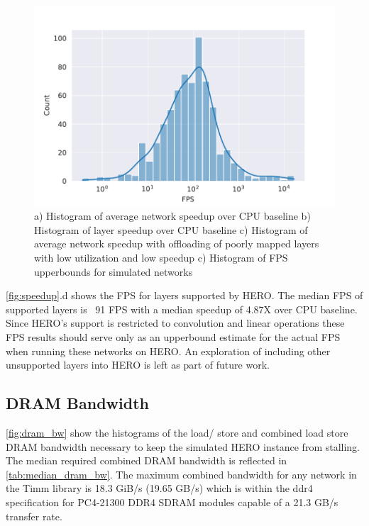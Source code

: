\begin{figure}
    \hspace{0.1cm} 
    \includegraphics[scale=0.46]{Plots/latency/fps.pdf}
    \caption{a) Histogram of average network speedup over CPU baseline b) Histogram of layer speedup over CPU baseline c) Histogram of average network speedup with offloading of poorly mapped layers with low utilization and low speedup c) Histogram of FPS upperbounds for simulated networks}
    \label{fig:speedup}
\end{figure}

\autoref{fig:speedup}.d  shows the FPS for layers supported by HERO. The median
FPS of supported layers is ~91 FPS with a median speedup of 4.87X over CPU
baseline. Since HERO's support is restricted to convolution and linear
operations these FPS results should serve only as an upperbound estimate for the
actual FPS when running these networks on HERO. An exploration of including
other unsupported layers into HERO is left as part of future work.  

\subsection{DRAM Bandwidth}
\label{chap:hero:results:bw}

\autoref{fig:dram_bw} show the histograms of the load/ store and combined
load store DRAM bandwidth necessary to keep the simulated HERO instance from
stalling. The median required combined DRAM bandwidth is reflected in
\autoref{tab:median_dram_bw}. The maximum combined bandwidth for any network in
the Timm library is 18.3 GiB/s (19.65 GB/s) which is within the ddr4 specification for
PC4-21300 DDR4 SDRAM modules \cite{wiki:List_of_interface_bit_rates} capable of
a 21.3 GB/s transfer rate. 

